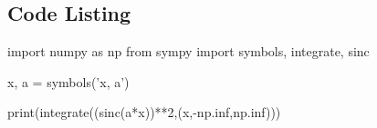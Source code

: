 \documentclass{article}
\begin{document}
    \subsubsection*{}
    \subsubsection*{}




\begin{appendices}
    \section{Code Listing}
    \begin{python}
    import numpy as np
    from sympy import symbols, integrate, sinc

    x, a = symbols('x, a')

    print(integrate((sinc(a*x))**2,(x,-np.inf,np.inf)))
    \end{python}
\end{appendices}
\end{document}
